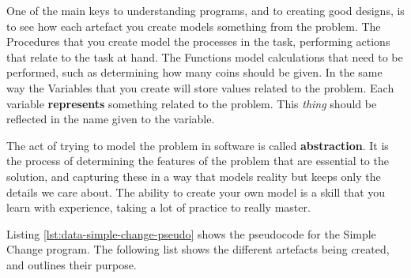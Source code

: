 One of the main keys to understanding programs, and to creating good designs, is to see how each artefact you create models something from the problem. The Procedures that you create model the processes in the task, performing actions that relate to the task at hand. The Functions model calculations that need to be performed, such as determining how many coins should be given. In the same way the Variables that you create will store values related to the problem. Each variable \textbf{represents} something related to the problem. This \emph{thing} should be reflected in the name given to the variable.

The act of trying to model the problem in software is called \textbf{abstraction}. It is the process of determining the features of the problem that are essential to the solution, and capturing these in a way that models reality but keeps only the details we care about. The ability to create your own model is a skill that you learn with experience, taking a lot of practice to really master.

\clearpage

Listing \ref{lst:data-simple-change-pseudo} shows the pseudocode for the Simple Change program. The following list shows the different artefacts being created, and outlines their purpose.

